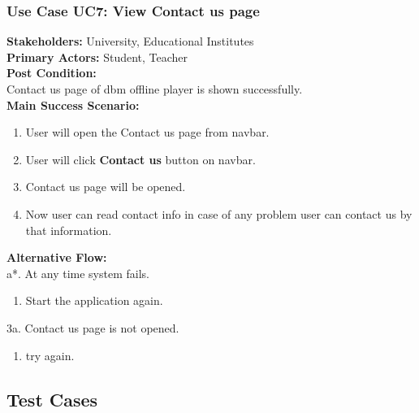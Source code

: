 \documentclass[12pt]{article}
\begin{document}
\subsubsection{Use Case UC7: View Contact us page}
\textbf{Stakeholders: } University, Educational Institutes \\
\textbf{Primary Actors: } Student, Teacher \\
\textbf{Post Condition: }\\
Contact us page of dbm offline player is shown successfully.\\
\textbf{Main Success Scenario: }
\begin{enumerate}
\item User will open the Contact us page from navbar.
\item User will click \textbf{Contact us} button on navbar.
\item Contact us page will be opened.
\item Now user can read contact info in case of any problem user can contact us by that information.

\end{enumerate}
\textbf{Alternative Flow: }\\
a*. At any time system fails.
\begin{enumerate}
\item Start the application again.
\end{enumerate}
3a. Contact us page is not opened.
\begin{enumerate}
\item try again.
\end{enumerate}

\subsection{Test Cases}
\end{document}

